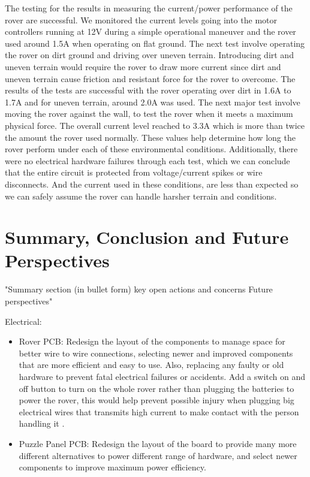 \documentclass[a4paper, 10pt]{article}
\begin{document}
The testing for the results in measuring the current/power performance of the rover are successful. We monitored the current levels going into the motor controllers running at 12V during a simple operational maneuver and the rover used around 1.5A when operating on flat ground. The next test involve operating the rover on dirt ground and driving over uneven terrain. Introducing dirt and uneven terrain would require the rover to draw more current since dirt and uneven terrain cause friction and resistant force for the rover to overcome. The results of the tests are successful with the rover operating over dirt in 1.6A to 1.7A and for uneven terrain, around 2.0A was used. The next major test involve moving the rover against the wall, to test the rover when it meets a maximum physical force. The overall current level reached to 3.3A which is more than twice the amount the rover used normally. These values help determine how long the rover perform under each of these environmental conditions. Additionally, there were no electrical hardware failures through each test, which we can conclude that the entire circuit is protected from voltage/current spikes or wire disconnects. And the current used in these conditions, are less than expected so we can safely assume the rover can handle harsher terrain and conditions.

\section{Summary, Conclusion and Future Perspectives}
"Summary section (in bullet form)
key open actions and concerns
Future perspectives"

Electrical:

\begin{itemize}
\item
Rover PCB: Redesign the layout of the components to manage space for better wire to wire connections, selecting newer and improved components that are more efficient and easy to use. Also, replacing any faulty or old hardware to prevent fatal electrical failures or accidents. Add a switch on and off button to turn on the whole rover rather than plugging the batteries to power the rover, this would help prevent possible injury when plugging big electrical wires that transmits high current to make contact with the person handling it
.

\item
Puzzle Panel PCB: Redesign the layout of the board to provide many more different alternatives to power different range of hardware, and select newer components to improve maximum power efficiency.

\end{itemize}
\end{document}
